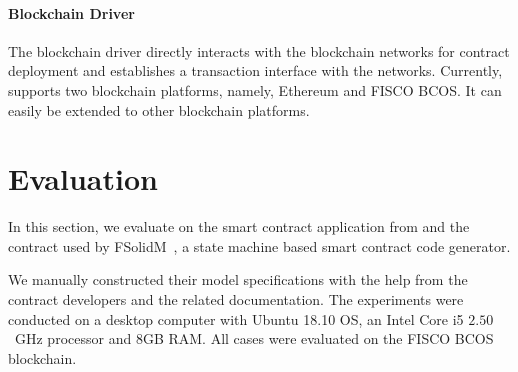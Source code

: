 

\paragraph{Blockchain Driver}
The blockchain driver directly interacts with the blockchain networks for contract deployment and
establishes a transaction interface with the networks.
Currently, \modcon supports two blockchain platforms, namely, Ethereum and FISCO BCOS.
It can easily be extended to other blockchain platforms.


\section{Evaluation}
\label{sec:eval}

In this section, we evaluate \modcon on the \wecredit smart contract application from \company and
the  contract used by FSolidM~\cite{mavridou2018designing}, a state machine
based smart contract code generator.

We manually constructed their model specifications with the help from the contract developers and
the related documentation.
The experiments were conducted on a desktop computer with Ubuntu 18.10 OS, an Intel Core i5 $2.50$~GHz processor and $8$GB RAM.
All cases were evaluated on the FISCO BCOS blockchain.


